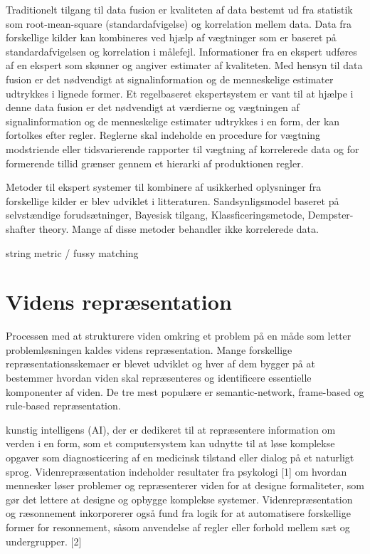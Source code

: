 Traditionelt tilgang til data fusion er kvaliteten af data bestemt ud fra statistik som root-mean-square (standardafvigelse) og korrelation mellem data. Data fra forskellige kilder kan kombineres ved hjælp af vægtninger som er baseret på standardafvigelsen og korrelation i målefejl. Informationer fra en ekspert udføres af en ekspert som skønner og angiver estimater af kvaliteten. Med hensyn til data fusion er det nødvendigt at signalinformation og de menneskelige estimater udtrykkes i lignede former. Et regelbaseret ekspertsystem er vant til at hjælpe i denne data fusion er det nødvendigt at værdierne og vægtningen af signalinformation og de menneskelige estimater udtrykkes i en form, der kan fortolkes efter regler. Reglerne skal indeholde en procedure for vægtning modstriende eller tidsvarierende rapporter til vægtning af korrelerede data og for
formerende tillid grænser gennem et hierarki af produktionen
regler.

Metoder til ekspert systemer til kombinere af usikkerhed oplysninger fra forskellige kilder er blev udviklet i litteraturen. Sandsynligsmodel baseret på selvstændige forudsætninger, Bayesisk tilgang, Klassficeringsmetode, Dempster-shafter theory. Mange af disse metoder behandler ikke korrelerede data.  
 
string metric / fussy matching


\section{Videns repræsentation}
Processen med at strukturere viden omkring et problem på en måde som letter problemløsningen kaldes videns repræsentation. Mange forskellige repræsentationsskemaer er blevet udviklet og hver af dem bygger på at bestemmer hvordan viden skal repræsenteres og identificere essentielle komponenter af viden. De tre mest populære er semantic-network, frame-based og rule-based repræsentation. 


kunstig intelligens (AI), der er dedikeret til at repræsentere information om verden i en form, som et computersystem kan udnytte til at løse komplekse opgaver som diagnosticering af en medicinsk tilstand eller dialog på et naturligt sprog. Videnrepræsentation indeholder resultater fra psykologi [1] om hvordan mennesker løser problemer og repræsenterer viden for at designe formaliteter, som gør det lettere at designe og opbygge komplekse systemer. Videnrepræsentation og ræsonnement inkorporerer også fund fra logik for at automatisere forskellige former for resonnement, såsom anvendelse af regler eller forhold mellem sæt og undergrupper. [2]


